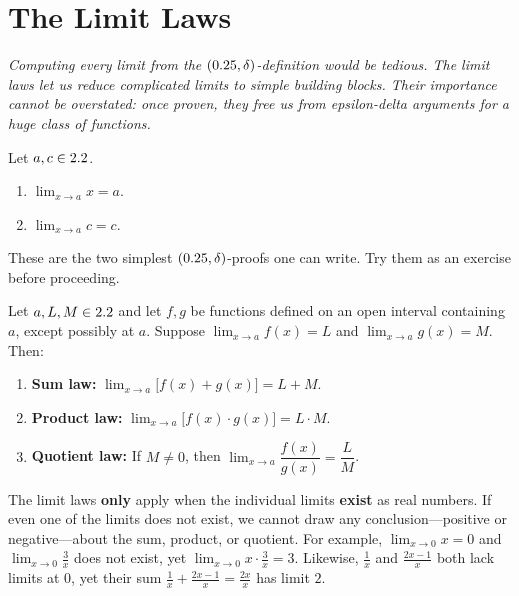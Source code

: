 \section{The Limit Laws}
\label{sec:2.10}

\textit{Computing every limit from the $(0.25, \delta)$-definition would be tedious.  The limit laws let us reduce complicated limits to simple building blocks.  Their importance cannot be overstated: once proven, they free us from epsilon-delta arguments for a huge class of functions.}

\begin{theorem}
\label{thm:2-6}
Let $a, c \in 2.2$.
\begin{enumerate}[label=(\roman*)]
  \item $\lim_{x \to a} x = a$.
  \item $\lim_{x \to a} c = c$.
\end{enumerate}
\end{theorem}

\begin{remark}
These are the two simplest $(0.25, \delta)$-proofs one can write.  Try them as an exercise before proceeding.
\end{remark}

\begin{theorem}
\label{thm:2-7}
Let $a, L, M \in 2.2$ and let $f, g$ be functions defined on an open interval containing $a$, except possibly at $a$.  Suppose $\lim_{x \to a} f(x) = L$ and $\lim_{x \to a} g(x) = M$.  Then:
\begin{enumerate}[label=(\roman*)]
  \item \textbf{Sum law:} $\lim_{x \to a} \bigl[f(x) + g(x)\bigr] = L + M$.
  \item \textbf{Product law:} $\lim_{x \to a} \bigl[f(x) \cdot g(x)\bigr] = L \cdot M$.
  \item \textbf{Quotient law:} If $M \neq 0$, then $\lim_{x \to a} \dfrac{f(x)}{g(x)} = \dfrac{L}{M}$.
\end{enumerate}
\end{theorem}

\begin{remark}[Warning]
The limit laws \textbf{only} apply when the individual limits \textbf{exist} as real numbers.  If even one of the limits does not exist, we cannot draw any conclusion---positive or negative---about the sum, product, or quotient.  For example, $\lim_{x \to 0} x = 0$ and $\lim_{x \to 0} \frac{3}{x}$ does not exist, yet $\lim_{x \to 0} x \cdot \frac{3}{x} = 3$.  Likewise, $\frac{1}{x}$ and $\frac{2x-1}{x}$ both lack limits at $0$, yet their sum $\frac{1}{x} + \frac{2x-1}{x} = \frac{2x}{x}$ has limit $2$.
\end{remark}

